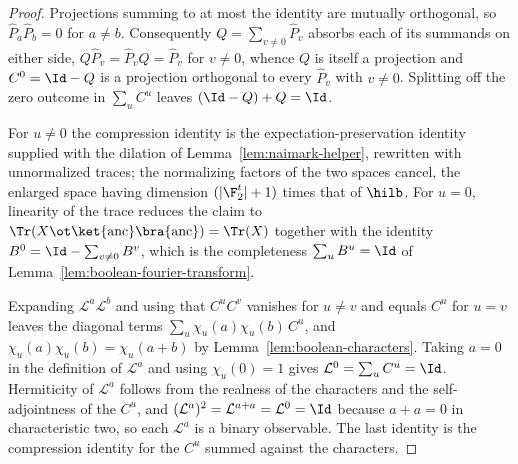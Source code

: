 \begin{proof}
	\leanok
	Projections summing to at most the identity are mutually orthogonal, so
	$\hat{P}_a \hat{P}_b = 0$ for $a \ne b$. Consequently
	$Q = \sum_{v \ne 0} \hat{P}_v$ absorbs each of its summands on either
	side, $Q \hat{P}_v = \hat{P}_v Q = \hat{P}_v$ for $v \ne 0$, whence $Q$ is
	itself a projection and $C^0 = \Id - Q$ is a projection orthogonal to
	every $\hat{P}_v$ with $v \ne 0$. Splitting off the zero outcome in
	$\sum_u C^u$ leaves $(\Id - Q) + Q = \Id$.

	For $u \ne 0$ the compression identity is the expectation-preservation
	identity supplied with the dilation of Lemma~\ref{lem:naimark-helper},
	rewritten with unnormalized traces; the normalizing factors of the two
	spaces cancel, the enlarged space having dimension
	$(\lvert \F_2^t \rvert + 1)$ times that of $\hilb$. For $u = 0$,
	linearity of the trace reduces the claim to
	$\Tr(X \ot \ket{\mathrm{anc}}\bra{\mathrm{anc}}) = \Tr(X)$ together with
	the identity $B^0 = \Id - \sum_{v \ne 0} B^v$, which is the completeness
	$\sum_u B^u = \Id$ of Lemma~\ref{lem:boolean-fourier-transform}.

	Expanding $\mathcal{L}^a \mathcal{L}^b$ and using that $C^u C^v$ vanishes
	for $u \ne v$ and equals $C^u$ for $u = v$ leaves the diagonal terms
	$\sum_u \chi_u(a) \chi_u(b) \, C^u$, and
	$\chi_u(a) \chi_u(b) = \chi_u(a+b)$ by
	Lemma~\ref{lem:boolean-characters}. Taking $a = 0$ in the definition of
	$\mathcal{L}^a$ and using $\chi_u(0) = 1$ gives
	$\mathcal{L}^0 = \sum_u C^u = \Id$. Hermiticity of $\mathcal{L}^a$ follows
	from the realness of the characters and the self-adjointness of the
	$C^u$, and $(\mathcal{L}^a)^2 = \mathcal{L}^{a+a} = \mathcal{L}^0 = \Id$
	because $a + a = 0$ in characteristic two, so each $\mathcal{L}^a$ is a
	binary observable. The last identity is the compression identity for the
	$C^u$ summed against the characters.
\end{proof}

